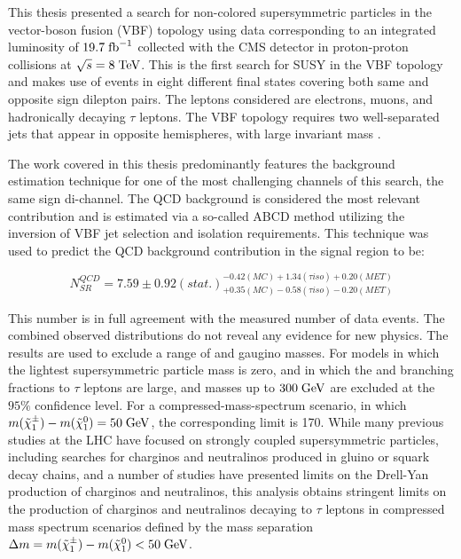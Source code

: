 This thesis presented a search for non-colored supersymmetric particles in the vector-boson fusion (VBF) topology using data corresponding to an integrated luminosity of $19.7\;\text{fb}^{-1}$ collected with the CMS detector in proton-proton collisions at $\sqrt{s} = 8\;\text{Te}\kern-0.06667em\text{V}$. This is the first search for SUSY in the VBF topology and makes use of events in eight different final states covering both same and opposite sign dilepton pairs. The leptons considered are electrons, muons, and hadronically decaying $\tau$ leptons. The VBF topology requires two well-separated jets that appear in opposite hemispheres, with large invariant mass \mjj. 

The work covered in this thesis predominantly features the background estimation technique for one of the most challenging channels of this search, the same sign di-\hadtau channel. The QCD background is considered the most relevant contribution and is estimated via a so-called ABCD method utilizing the inversion of VBF jet selection and \hadtau isolation requirements. This technique was used to predict the QCD background contribution in the signal region to be:

\begin{equation}
N^{QCD}_{SR} = 7.59\pm0.92(stat.)^{-0.42(MC)+1.34(\tau iso)+0.20(MET)}_{+0.35(MC)-0.58(\tau iso)-0.20(MET)}
\end{equation} 

This number is in full agreement with the measured number of data events. The combined observed \mjj distributions do not reveal any evidence for new physics. The results are used to exclude a range of \charginopm and \neutralinotwo gaugino masses. For models in which the \neutralinoone lightest supersymmetric particle mass is zero, and in which the \charginopm and \neutralinotwo branching fractions to $\tau$ leptons are large, \charginopm and \neutralinotwo masses up to $300\;\text{Ge}\kern-0.06667em\text{V}$ are excluded at the $95\%$ confidence level. For a compressed-mass-spectrum scenario, in which $m(\tilde{\chi}^{\pm}_{1}) - m(\tilde{\chi}^{0}_{1}) = 50\;\text{Ge}\kern-0.06667em\text{V}$, the corresponding limit is 170\gev. While many previous studies at the LHC have focused on strongly coupled supersymmetric particles, including searches for charginos and neutralinos produced in gluino or squark decay chains, and a number of studies have presented limits on the Drell-Yan production of charginos and neutralinos, this analysis obtains stringent limits on the production of charginos and neutralinos decaying to $\tau$ leptons in compressed mass spectrum scenarios defined by the mass separation $\Delta m = m(\tilde{\chi}^{\pm}_{1}) - m(\tilde{\chi}^{0}_{1}) < 50\;\text{Ge}\kern-0.06667em\text{V}$.

